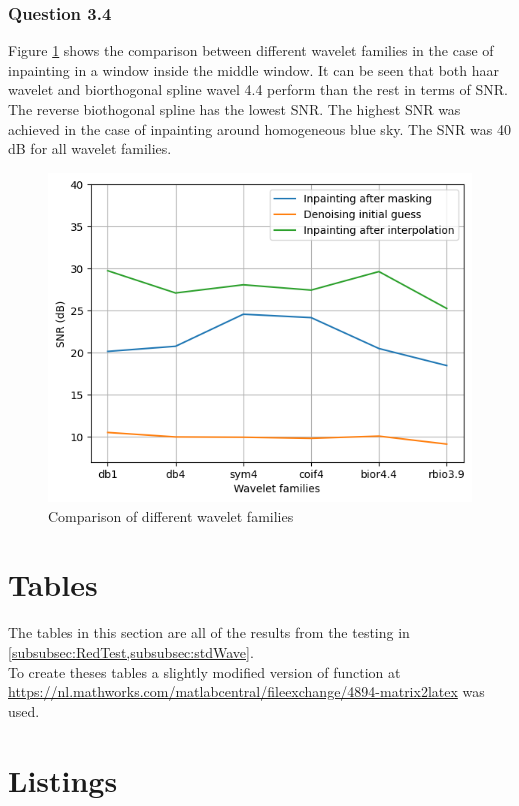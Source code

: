 \documentclass[a4paper]{article}
\begin{document}
\subsubsection{Question 3.4}
Figure \ref{windowaveletcomparer} shows the comparison between different wavelet families in the case of inpainting in a window inside the middle window. It can be seen that both haar wavelet and biorthogonal spline wavel 4.4 perform than the rest in terms of SNR. The reverse biothogonal spline has the lowest SNR. The highest SNR was achieved in the case of inpainting around homogeneous blue sky. The SNR was 40 dB for all wavelet families.

\begin{figure}[H]
	\centering %
	\includegraphics[width=0.7\linewidth]{Images/wavelet_comparison_window.png}
	\caption{Comparison of different wavelet families}
	\label{windowaveletcomparer}
\end{figure}

	\newpage

	\appendix
	
	\section{Tables}
	The tables in this section are all of the results from the testing in \cref{subsubsec:RedTest,subsubsec:stdWave}. \\
	To create theses tables a slightly modified version of function at \url{https://nl.mathworks.com/matlabcentral/fileexchange/4894-matrix2latex} was used.
	
	
	
	
	
	
	
	
	\section{Listings}
\end{document}

